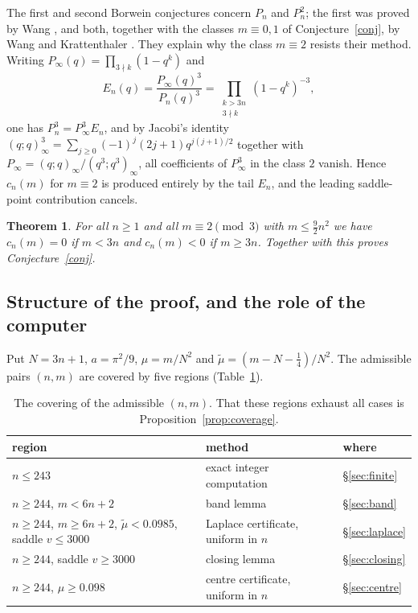 \documentclass[11pt,reqno]{amsart}
\theoremstyle{plain}
\newtheorem{theorem}{Theorem}[section]
\theoremstyle{definition}
\begin{document}
The first and second Borwein conjectures \cite{Andrews} concern $P_n$ and $P_n^2$; the first was proved by Wang \cite{Wang}, and both, together
with the classes $m\equiv0,1$ of Conjecture~\ref{conj}, by Wang and Krattenthaler \cite{WK}. They explain \cite[\S11]{WK} why
the class $m\equiv2$ resists their method. Writing $P_\infty(q)=\prod_{3\nmid k}(1-q^k)$ and
\[
E_n(q)=\frac{P_\infty(q)^3}{P_n(q)^3}=\prod_{\substack{k>3n\\3\nmid k}}(1-q^k)^{-3},
\]
one has $P_n^3=P_\infty^3E_n$, and by Jacobi's identity $(q;q)_\infty^3=\sum_{j\ge0}(-1)^j(2j+1)q^{j(j+1)/2}$ together with
$P_\infty=(q;q)_\infty/(q^3;q^3)_\infty$, all coefficients of $P_\infty^3$ in the class $2$ vanish. Hence $c_n(m)$ for
$m\equiv2$ is produced entirely by the tail $E_n$, and the leading saddle-point contribution cancels.

\begin{theorem}\label{thm:main}
For all $n\ge1$ and all $m\equiv2\pmod3$ with $m\le\frac92n^2$ we have $c_n(m)=0$ if $m<3n$ and $c_n(m)<0$ if $m\ge3n$.
Together with \cite{WK} this proves Conjecture~\ref{conj}.
\end{theorem}

\subsection*{Structure of the proof, and the role of the computer}
Put $N=3n+1$, $a=\pi^2/9$, $\mu=m/N^2$ and $\widetilde\mu=(m-N-\frac14)/N^2$. The admissible pairs $(n,m)$ are covered by five
regions (Table~\ref{tab:regions}).

\begin{table}[h]
\centering
\begin{tabular}{lll}
\toprule
region & method & where\\
\midrule
$n\le243$ & exact integer computation & \S\ref{sec:finite}\\
$n\ge244$, $m<6n+2$ & band lemma & \S\ref{sec:band}\\
$n\ge244$, $m\ge 6n+2$, $\widetilde\mu<0.0985$, saddle $v\le3000$ & Laplace certificate, uniform in $n$ & \S\ref{sec:laplace}\\
$n\ge244$, saddle $v\ge3000$ & closing lemma & \S\ref{sec:closing}\\
$n\ge244$, $\mu\ge0.098$ & centre certificate, uniform in $n$ & \S\ref{sec:centre}\\
\bottomrule
\end{tabular}
\caption{The covering of the admissible $(n,m)$. That these regions exhaust all cases is Proposition~\ref{prop:coverage}.}
\label{tab:regions}
\end{table}
\end{document}
